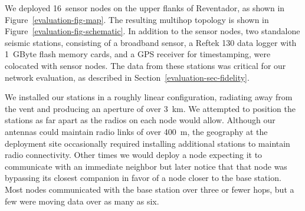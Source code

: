 We deployed 16~sensor nodes on the upper flanks of Reventador, as shown in
Figure~\ref{evaluation-fig-map}. The resulting multihop topology is shown in
Figure~\ref{evaluation-fig-schematic}. In addition to the sensor nodes, two
standalone seismic stations, consisting of a broadband sensor, a Reftek 130
data logger with 1~GByte flash memory cards, and a GPS receiver for
timestamping, were colocated with sensor nodes. The data from these stations
was critical for our network evaluation, as described in
Section~\ref{evaluation-sec-fidelity}.

\vfill\eject

We installed our stations in a roughly linear configuration, radiating away
from the vent and producing an aperture of over 3~km. We attempted to
position the stations as far apart as the radios on each node would allow.
Although our antennas could maintain radio links of over 400~m, the geography
at the deployment site occasionally required installing additional stations
to maintain radio connectivity. Other times we would deploy a node expecting
it to communicate with an immediate neighbor but later notice that that node
was bypassing its closest companion in favor of a node closer to the base
station. Most nodes communicated with the base station over three or fewer
hops, but a few were moving data over as many as six.

